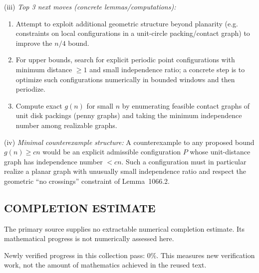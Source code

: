 (iii) \emph{Top 3 next moves (concrete lemmas/computations):}
\begin{enumerate}
\item Attempt to exploit additional geometric structure beyond planarity (e.g. constraints on local configurations in a unit-circle packing/contact graph) to improve the $n/4$ bound.
\item For upper bounds, search for explicit periodic point configurations with minimum distance $\ge 1$ and small independence ratio; a concrete step is to optimize such configurations numerically in bounded windows and then periodize.
\item Compute exact $g(n)$ for small $n$ by enumerating feasible contact graphs of unit disk packings (penny graphs) and taking the minimum independence number among realizable graphs.
\end{enumerate}

(iv) \emph{Minimal counterexample structure:}
A counterexample to any proposed bound $g(n)\ge c n$ would be an explicit admissible configuration $P$ whose unit-distance graph has independence number $<c n$.  Such a configuration must in particular realize a planar graph with unusually small independence ratio and respect the geometric ``no crossings'' constraint of Lemma~1066.2.




\subsection*{COMPLETION ESTIMATE}
The primary source supplies no extractable numerical completion estimate. Its mathematical progress is not numerically assessed here.

Newly verified progress in this collection pass: $0\%$. This measures new verification work, not the amount of mathematics achieved in the reused text.
